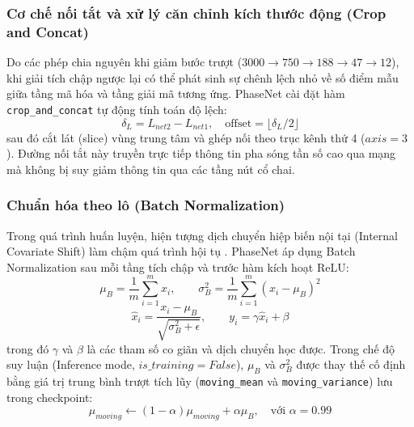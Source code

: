 \documentclass[preprint,1p]{elsarticle}
\begin{document}
\subsubsection{Cơ chế nối tắt và xử lý căn chỉnh kích thước động (Crop and Concat)}
Do các phép chia nguyên khi giảm bước trượt ($3000 \to 750 \to 188 \to 47 \to 12$), khi giải tích chập ngược lại có thể phát sinh sự chênh lệch nhỏ về số điểm mẫu giữa tầng mã hóa và tầng giải mã tương ứng. PhaseNet cài đặt hàm \texttt{crop\_and\_concat} tự động tính toán độ lệch:
\begin{equation}
\delta_L = L_{net2} - L_{net1}, \quad \text{offset} = \lfloor \delta_L / 2 \rfloor
\label{eq:crop_offset}
\end{equation}
sau đó cắt lát (slice) vùng trung tâm và ghép nối theo trục kênh thứ 4 ($axis = 3$). Đường nối tắt này truyền trực tiếp thông tin pha sóng tần số cao qua mạng mà không bị suy giảm thông tin qua các tầng nút cổ chai.

\subsubsection{Chuẩn hóa theo lô (Batch Normalization)}
Trong quá trình huấn luyện, hiện tượng dịch chuyển hiệp biến nội tại (Internal Covariate Shift) làm chậm quá trình hội tụ \cite{ioffe2015batch}. PhaseNet áp dụng Batch Normalization sau mỗi tầng tích chập và trước hàm kích hoạt ReLU:
\begin{equation}
\mu_B = \frac{1}{m} \sum_{i=1}^{m} x_i, \qquad \sigma_B^2 = \frac{1}{m} \sum_{i=1}^{m} (x_i - \mu_B)^2
\label{eq:bn_stat}
\end{equation}
\begin{equation}
\hat{x}_i = \frac{x_i - \mu_B}{\sqrt{\sigma_B^2 + \epsilon}}, \qquad y_i = \gamma \hat{x}_i + \beta
\label{eq:bn_norm}
\end{equation}
trong đó $\gamma$ và $\beta$ là các tham số co giãn và dịch chuyển học được. Trong chế độ suy luận (Inference mode, $is\_training = False$), $\mu_B$ và $\sigma_B^2$ được thay thế cố định bằng giá trị trung bình trượt tích lũy (\texttt{moving\_mean} và \texttt{moving\_variance}) lưu trong checkpoint:
\begin{equation}
\mu_{moving} \leftarrow (1 - \alpha) \mu_{moving} + \alpha \mu_B, \quad \text{với } \alpha = 0.99
\label{eq:moving_stat}
\end{equation}
\end{document}
